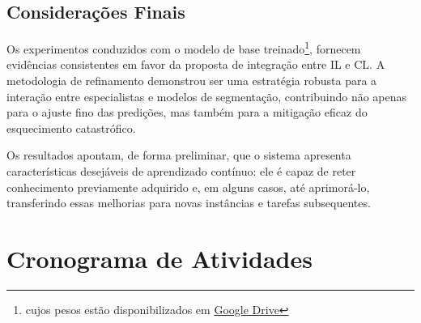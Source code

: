 

\subsection{Considerações Finais}

Os experimentos conduzidos com o modelo de base treinado\footnote{cujos pesos estão disponibilizados em \href{https://drive.google.com/drive/folders/1DDUn92UvHF2amcSak7gqQct19w3JMUq-?usp=drive_link}{Google Drive}}, fornecem evidências consistentes em favor da proposta de integração entre \ac{IL} e \ac{CL}. A metodologia de refinamento demonstrou ser uma estratégia robusta para a interação entre especialistas e modelos de segmentação, contribuindo não apenas para o ajuste fino das predições, mas também para a mitigação eficaz do esquecimento catastrófico.

Os resultados apontam, de forma preliminar, que o sistema apresenta características desejáveis de aprendizado contínuo: ele é capaz de reter conhecimento previamente adquirido e, em alguns casos, até aprimorá-lo, transferindo essas melhorias para novas instâncias e tarefas subsequentes.




\section{Cronograma de Atividades}

